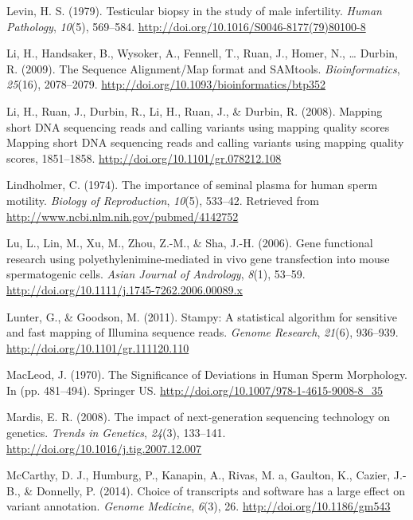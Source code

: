 \documentclass[12pt,twoside]{reedthesis}
\theoremstyle{definition}
\theoremstyle{definition}
\theoremstyle{remark}
\begin{document}
  \hypertarget{ref-Levin1979}{}
  Levin, H. S. (1979). Testicular biopsy in the study of male infertility.
  \emph{Human Pathology}, \emph{10}(5), 569--584.
  \url{http://doi.org/10.1016/S0046-8177(79)80100-8}
  
  \hypertarget{ref-Li2009}{}
  Li, H., Handsaker, B., Wysoker, A., Fennell, T., Ruan, J., Homer, N.,
  \ldots{} Durbin, R. (2009). The Sequence Alignment/Map format and
  SAMtools. \emph{Bioinformatics}, \emph{25}(16), 2078--2079.
  \url{http://doi.org/10.1093/bioinformatics/btp352}
  
  \hypertarget{ref-Li2008}{}
  Li, H., Ruan, J., Durbin, R., Li, H., Ruan, J., \& Durbin, R. (2008).
  Mapping short DNA sequencing reads and calling variants using mapping
  quality scores Mapping short DNA sequencing reads and calling variants
  using mapping quality scores, 1851--1858.
  \url{http://doi.org/10.1101/gr.078212.108}
  
  \hypertarget{ref-Lindholmer1974}{}
  Lindholmer, C. (1974). The importance of seminal plasma for human sperm
  motility. \emph{Biology of Reproduction}, \emph{10}(5), 533--42.
  Retrieved from \url{http://www.ncbi.nlm.nih.gov/pubmed/4142752}
  
  \hypertarget{ref-Lu2006}{}
  Lu, L., Lin, M., Xu, M., Zhou, Z.-M., \& Sha, J.-H. (2006). Gene
  functional research using polyethylenimine-mediated in vivo gene
  transfection into mouse spermatogenic cells. \emph{Asian Journal of
  Andrology}, \emph{8}(1), 53--59.
  \url{http://doi.org/10.1111/j.1745-7262.2006.00089.x}
  
  \hypertarget{ref-Lunter2011}{}
  Lunter, G., \& Goodson, M. (2011). Stampy: A statistical algorithm for
  sensitive and fast mapping of Illumina sequence reads. \emph{Genome
  Research}, \emph{21}(6), 936--939.
  \url{http://doi.org/10.1101/gr.111120.110}
  
  \hypertarget{ref-MacLeod1970}{}
  MacLeod, J. (1970). The Significance of Deviations in Human Sperm
  Morphology. In (pp. 481--494). Springer US.
  \url{http://doi.org/10.1007/978-1-4615-9008-8_35}
  
  \hypertarget{ref-Mardis2008}{}
  Mardis, E. R. (2008). The impact of next-generation sequencing
  technology on genetics. \emph{Trends in Genetics}, \emph{24}(3),
  133--141. \url{http://doi.org/10.1016/j.tig.2007.12.007}
  
  \hypertarget{ref-McCarthy2014}{}
  McCarthy, D. J., Humburg, P., Kanapin, A., Rivas, M. a, Gaulton, K.,
  Cazier, J.-B., \& Donnelly, P. (2014). Choice of transcripts and
  software has a large effect on variant annotation. \emph{Genome
  Medicine}, \emph{6}(3), 26. \url{http://doi.org/10.1186/gm543}
  
\end{document}
